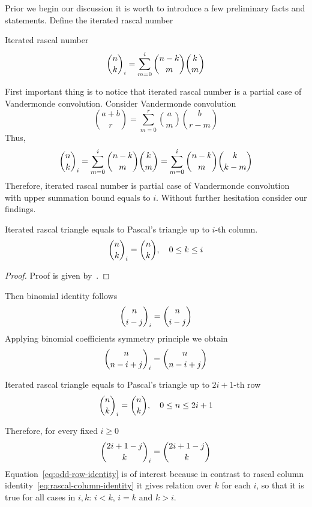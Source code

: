 ﻿Prior we begin our discussion it is worth to introduce a few preliminary facts and statements.
Define the iterated rascal number
\begin{definition}
    Iterated rascal number~\cite{gregory2023iterated}
    \begin{align}
        \binom{n}{k}_{i} = \sum_{m=0}^{i} \binom{n-k}{m} \binom{k}{m}
    \end{align}
\end{definition}
First important thing is to notice that iterated rascal number is a partial case of Vandermonde convolution.
Consider Vandermonde convolution
\begin{equation*}
    \binom{a+b}{r} = \sum_{m=0}^{r} \binom{a}{m} \binom{b}{r-m}
\end{equation*}
Thus,
\begin{equation}
    \binom{n}{k}_{i} = \sum_{m=0}^{i} \binom{n-k}{m} \binom{k}{m} = \sum_{m=0}^{i} \binom{n-k}{m} \binom{k}{k-m}
    \label{eq:rascal-vandermonde-convolution}
\end{equation}
Therefore, iterated rascal number is partial case of Vandermonde convolution with upper summation bound equals to $i$.
Without further hesitation consider our findings.
\begin{proposition}
    Iterated rascal triangle equals to Pascal's triangle up to $i$-th column.
    \begin{equation}
        \binom{n}{k}_{i} = \binom{n}{k}, \quad 0 \leq k \leq i\label{eq:rascal-column-identity}
    \end{equation}
    \begin{proof}
        Proof is given by~\cite{gregory2023iterated}.
    \end{proof}
\end{proposition}
Then binomial identity follows
\begin{align*}
    \binom{n}{i-j}_{i} = \binom{n}{i-j}
\end{align*}
Applying binomial coefficients symmetry principle we obtain
\begin{align*}
    \binom{n}{n-i+j}_{i} = \binom{n}{n-i+j}
\end{align*}
\begin{proposition}
    \label{prop:odd-row-proposition}
    Iterated rascal triangle equals to Pascal's triangle up to $2i+1$-th row
    \begin{align*}
        \binom{n}{k}_{i} = \binom{n}{k}, \quad 0 \leq n \leq 2i+1
    \end{align*}
\end{proposition}
Therefore, for every fixed $i \geq 0$
\begin{equation}
    \binom{2i+1-j}{k}_{i} = \binom{2i+1-j}{k}\label{eq:odd-row-identity}
\end{equation}
Equation~\eqref{eq:odd-row-identity} is of interest because in contrast to rascal
column identity~\eqref{eq:rascal-column-identity} it gives relation over $k$ for each $i$,
so that it is true for all cases in $i,k$: $i < k$, $i=k$ and $k >i$.

